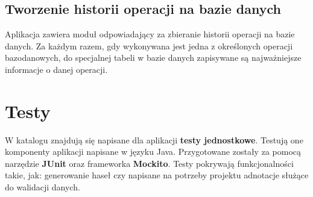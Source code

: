 \documentclass[11pt]{article}
\begin{document}
\subsection{Tworzenie historii operacji na bazie danych}
Aplikacja zawiera moduł odpowiadający za zbieranie historii operacji na bazie danych. Za każdym razem, gdy wykonywana jest jedna z określonych operacji bazodanowych, do specjalnej tabeli w bazie danych zapisywane są najważniejsze informacje o danej operacji.




\section{Testy}
W katalogu  znajdują się napisane dla aplikacji \textbf{testy jednostkowe}. Testują one komponenty aplikacji napisane w języku Java. Przygotowane zostały za pomocą narzędzie \textbf{JUnit} oraz frameworka \textbf{Mockito}. Testy pokrywają funkcjonalności takie, jak: generowanie haseł czy napisane na potrzeby projektu adnotacje służące do walidacji danych.
\end{document}
